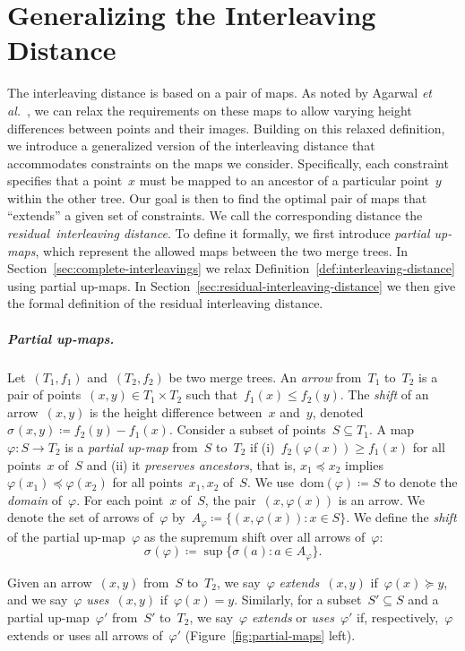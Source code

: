 \documentclass[a4paper,UKenglish, autoref, thm-restate, cleveref]{lipics-v2021}
\newcommand{\etal}{\emph{et al.}}
\newcommand{\dom}{\mathrm{dom}}
\newcommand{\shift}[1]{\sigma_{#1}}
\renewcommand{\phi}{\varphi}
\renewcommand{\mid}{:}
\begin{document}
\section{Generalizing the Interleaving Distance}\label{sec:generalizing-interleaving-distance}
The interleaving distance is based on a pair of maps.
As noted by Agarwal \etal~\cite{agarwal2018computing}, we can relax the requirements on these maps to allow varying height differences between points and their images.
Building on this relaxed definition, we introduce a generalized version of the interleaving distance that accommodates constraints on the maps we consider.
Specifically, each constraint specifies that a point~$x$ must be mapped to an ancestor of a particular point~$y$ within the other tree.
Our goal is then to find the optimal pair of maps that ``extends'' a given set of constraints.
We call the corresponding distance the \emph{residual~interleaving distance}.
To define it formally, we first introduce \emph{partial up-maps}, which represent the allowed maps between the two merge trees.
In Section~\ref{sec:complete-interleavings} we relax Definition~\ref{def:interleaving-distance} using partial up-maps.
In Section~\ref{sec:residual-interleaving-distance} we then give the formal definition of the residual interleaving distance.

\subparagraph{Partial up-maps.}
Let~$(T_1, f_1)$ and~$(T_2, f_2)$ be two merge trees.
An \emph{arrow} from~$T_1$ to~$T_2$ is a pair of points~$(x, y) \in T_1 \times T_2$ such that~$f_1(x) \le f_2(y)$.
The \emph{shift} of an arrow~$(x, y)$ is the height difference between~$x$ and~$y$, denoted~$\shift{}(x, y) \coloneqq f_2(y) - f_1(x)$.
Consider a subset of points~$S \subseteq T_1$.
A map~$\phi \colon S \to T_2$ is a \emph{partial up-map} from~$S$ to~$T_2$ if (i)~$f_2(\phi(x)) \ge f_1(x)$ for all points~$x$ of~$S$ and (ii) it \emph{preserves ancestors}, that is, $x_1 \preceq x_2$ implies~$\phi(x_1) \preceq \phi(x_2)$ for all points~$x_1, x_2$ of~$S$.
We use~$\dom(\phi) \coloneqq S$ to denote the \emph{domain} of~$\phi$.
For each point~$x$ of~$S$, the pair~$(x, \phi(x))$ is an arrow.
We denote the set of arrows of~$\phi$ by~$A_\phi \coloneqq \{(x, \phi(x)) \mid x \in S\}$.
We define the \emph{shift} of the partial up-map~$\phi$ as the supremum shift over all arrows of~$\phi$:
\begin{equation}\label{eq:shift}
    \shift{}(\phi) \coloneqq \sup\{\shift{}(a) \mid a \in A_\phi\}.
\end{equation}

Given an arrow~$(x, y)$ from~$S$ to~$T_2$, we say~$\phi$ \emph{extends}~$(x, y)$ if~$\phi(x) \succeq y$, and we say~$\phi$ \emph{uses}~$(x, y)$ if~$\phi(x) = y$.
Similarly, for a subset~$S' \subseteq S$ and a partial up-map~$\phi'$ from~$S'$ to~$T_2$, we say~$\phi$ \emph{extends} or \emph{uses}~$\phi'$ if, respectively,~$\phi$ extends or uses all arrows of~$\phi'$ (Figure~\ref{fig:partial-maps} left).
\end{document}
